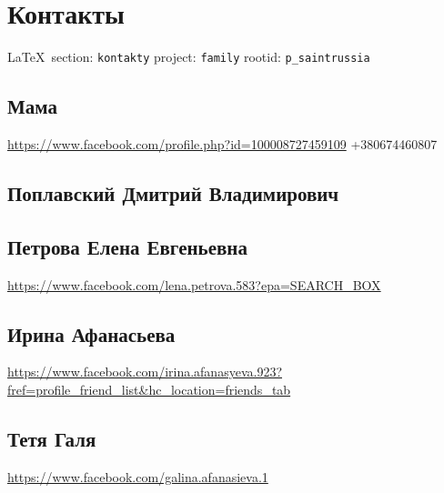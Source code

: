  
 
\section{Контакты}

\vspace{0.5cm}
 {\ifDEBUG\small\LaTeX~section: \verb|kontakty| project: \verb|family| rootid: \verb|p_saintrussia| \fi}
\vspace{0.5cm}

\subsection{Мама}
\url{https://www.facebook.com/profile.php?id=100008727459109}
+380674460807

\subsection{Поплавский Дмитрий Владимирович}




\subsection{Петрова Елена Евгеньевна}
\url{https://www.facebook.com/lena.petrova.583?epa=SEARCH_BOX}


\subsection{Ирина Афанасьева}
\url{https://www.facebook.com/irina.afanasyeva.923?fref=profile_friend_list&hc_location=friends_tab}

\subsection{Тетя Галя}
\url{https://www.facebook.com/galina.afanasieva.1}
  
